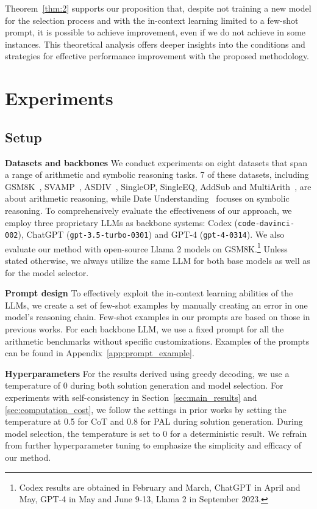 \documentclass[11pt]{article}
\begin{document}
Theorem~\ref{thm:2} supports our proposition that, despite not training a new model for the selection process and with the in-context learning limited to a few-shot prompt, it is possible to achieve improvement, even if we do not achieve  in some instances. This theoretical analysis offers deeper insights into the conditions and strategies for effective performance improvement with the proposed methodology. 

\section{Experiments}

\subsection{Setup}\label{sec:setup}
\textbf{Datasets and backbones} 
We conduct experiments on eight datasets that span a range of arithmetic and symbolic reasoning tasks. 7 of these datasets, including GSM8K~\citep{Cobbe2021TrainingVT}, SVAMP~\citep{Patel2021AreNM}, ASDIV~\citep{Miao2020ADC}, SingleOP, SingleEQ, AddSub and MultiArith~\citep{KoncelKedziorski2016MAWPSAM}, are about arithmetic reasoning, while Date Understanding~\citep{Srivastava2022BeyondTI} focuses on symbolic reasoning. To comprehensively evaluate the effectiveness of our approach, we employ three proprietary LLMs as backbone systems: Codex (\texttt{code-davinci-002}), ChatGPT (\texttt{gpt-3.5-turbo-0301}) and GPT-4 (\texttt{gpt-4-0314}). We also evaluate our method with open-source Llama 2 models on GSM8K.\footnote{Codex results are obtained in February and March, ChatGPT in April and May, GPT-4 in May and June 9-13, Llama 2 in September 2023.} Unless stated otherwise, we always utilize the same LLM for both base models as well as for the model selector.

\textbf{Prompt design}
To effectively exploit the in-context learning abilities of the LLMs, we create a set of few-shot examples by manually creating an error in one model's reasoning chain. Few-shot examples in our prompts are based on those in previous works. For each backbone LLM, we use a fixed prompt for all the arithmetic benchmarks without specific customizations. Examples of the prompts can be found in Appendix~\ref{app:prompt_example}.

\textbf{Hyperparameters} 
For the results derived using greedy decoding, we use a temperature of 0 during both solution generation and model selection. For experiments with self-consistency in Section~\ref{sec:main_results} and \ref{sec:computation_cost}, we follow the settings in prior works by setting the temperature at 0.5 for CoT and 0.8 for PAL during solution generation. During model selection, the temperature is set to 0 for a deterministic result. We refrain from further hyperparameter tuning to emphasize the simplicity and efficacy of our method.
\end{document}
